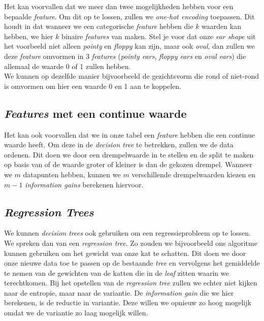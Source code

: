 Het kan voorvallen dat we meer dan twee mogelijkheden hebben voor een bepaalde \textit{feature}. Om dit op te lossen, zullen we \textit{one-hot encoding} toepassen. Dit houdt in dat wanneer we een categorische \textit{feature} hebben die $k$ waarden kan hebben, we hier $k$ binaire \textit{features} van maken. Stel je voor dat onze \textit{ear shape} uit het voorbeeld niet alleen \textit{pointy} en \textit{floppy} kan zijn, maar ook \textit{oval}, dan zullen we deze \textit{feature} omvormen in 3 \textit{features} (\textit{pointy ears}, \textit{floppy ears} en \textit{oval ears}) die allemaal de waarde 0 of 1 zullen hebben. \\
\newline
We kunnen op dezelfde manier bijvoorbeeld de gezichtsvorm die rond of niet-rond is omvormen om hier een waarde 0 en 1 aan te koppelen.

\subsection{\textit{Features} met een continue waarde}

Het kan ook voorvallen dat we in onze tabel een \textit{feature} hebben die een continue waarde heeft. Om deze in de \textit{decision tree} te betrekken, zullen we de data ordenen. Dit doen we door een drempelwaarde in te stellen en de split te maken op basis van of de waarde groter of kleiner is dan de gekozen drempel. Wanneer we $m$ datapunten hebben, kunnen we $m$ verschillende drempelwaarden kiezen en $m-1$ \textit{information gains} berekenen hiervoor.

\subsection{\textit{Regression Trees}}

We kunnen \textit{decision trees} ook gebruiken om een regressieprobleem op te lossen. We spreken dan van een \textit{regression tree}. Zo zouden we bijvoorbeeld ons algoritme kunnen gebruiken om het gewicht van onze kat te schatten. Dit doen we door onze nieuwe data toe te passen op de bestaande \textit{tree} en vervolgens het gemiddelde te nemen van de gewichten van de katten die in de \textit{leaf} zitten waarin we terechtkomen. Bij het opstellen van de \textit{regression tree} zullen we echter niet kijken naar de entropie, maar naar de variantie. De \textit{information gain} die we hier berekenen, is de reductie in variantie. Deze willen we opnieuw zo hoog mogelijk omdat we de variantie zo laag mogelijk willen. 

